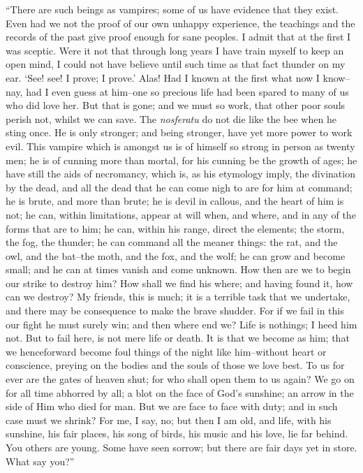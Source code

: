 \documentclass[12pt,openright]{book}
\begin{document}
“There are such beings as vampires; some of us have evidence that they exist. Even had we not the proof of our own unhappy experience, the teachings and the records of the past give proof enough for sane peoples. I admit that at the first I was sceptic. Were it not that through long years I have train myself to keep an open mind, I could not have believe until such time as that fact thunder on my ear. ‘See! see! I prove; I prove.’ Alas! Had I known at the first what now I know–nay, had I even guess at him–one so precious life had been spared to many of us who did love her. But that is gone; and we must so work, that other poor souls perish not, whilst we can save. The \textit{nosferatu} do not die like the bee when he sting once. He is only stronger; and being stronger, have yet more power to work evil. This vampire which is amongst us is of himself so strong in person as twenty men; he is of cunning more than mortal, for his cunning be the growth of ages; he have still the aids of necromancy, which is, as his etymology imply, the divination by the dead, and all the dead that he can come nigh to are for him at command; he is brute, and more than brute; he is devil in callous, and the heart of him is not; he can, within limitations, appear at will when, and where, and in any of the forms that are to him; he can, within his range, direct the elements; the storm, the fog, the thunder; he can command all the meaner things: the rat, and the owl, and the bat–the moth, and the fox, and the wolf; he can grow and become small; and he can at times vanish and come unknown. How then are we to begin our strike to destroy him? How shall we find his where; and having found it, how can we destroy? My friends, this is much; it is a terrible task that we undertake, and there may be consequence to make the brave shudder. For if we fail in this our fight he must surely win; and then where end we? Life is nothings; I heed him not. But to fail here, is not mere life or death. It is that we become as him; that we henceforward become foul things of the night like him–without heart or conscience, preying on the bodies and the souls of those we love best. To us for ever are the gates of heaven shut; for who shall open them to us again? We go on for all time abhorred by all; a blot on the face of God’s sunshine; an arrow in the side of Him who died for man. But we are face to face with duty; and in such case must we shrink? For me, I say, no; but then I am old, and life, with his sunshine, his fair places, his song of birds, his music and his love, lie far behind. You others are young. Some have seen sorrow; but there are fair days yet in store. What say you?”
\end{document}
